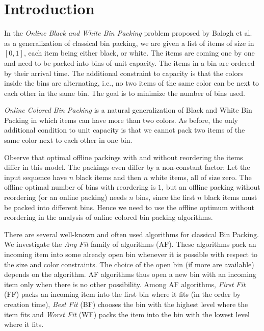 \documentclass[11pt,a4paper]{article}
\begin{document}
\section{Introduction}

In the \textit{Online Black and White Bin Packing} problem proposed by
Balogh et al.~\cite{balogh13,balogh14} as a generalization of
classical bin packing, we are given a list of items of size in $[0,
  1]$, each item being either black, or white.  The items are coming
one by one and need to be packed into bins of unit capacity.
The items in a bin are ordered by their arrival
time. The additional constraint to capacity is that the
colors inside the bins are alternating, i.e., no two items of the same color
can be next to each other in the same bin.  The goal is to minimize
the number of bins used.

\textit{Online Colored Bin Packing} is a natural generalization of
Black and White Bin Packing in which items can have more than two
colors.  As before, the only additional condition to unit capacity is that we
cannot pack two items of the same color next to each
other in one bin.

Observe that optimal offline packings with and without reordering the
items differ in this model. The packings even differ by a non-constant
factor: Let the input sequence have $n$ black items and then $n$ white
items, all of size zero. The offline optimal number of bins with
reordering is $1$, but an offline packing without reordering (or an
online packing) needs $n$ bins, since the first $n$ black items must
be packed into different bins.  Hence we need to use the offline
optimum without reordering in the analysis of online colored bin
packing algorithms.

There are several well-known and often used algorithms for classical
Bin Packing. We investigate the \textit{Any Fit} family of algorithms (AF). These algorithms
pack an incoming item into some already open bin whenever
it is possible with respect to the size and color constraints.
The choice of the open bin (if more are available) depends on the algorithm.  AF
algorithms thus open a new bin with an incoming item only when there
is no other possibility. Among AF algorithms, \textit{First Fit}
(FF) packs an incoming item into the first bin where it fits (in the
order by creation time), \textit{Best Fit} (BF) chooses the bin with
the highest level where the item fits and \textit{Worst Fit} (WF)
packs the item into the bin with the lowest level where it fits.
\end{document}
